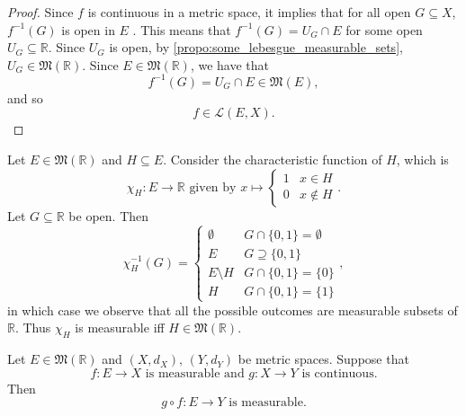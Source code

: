 \documentclass[notoc,notitlepage]{tufte-book}
\begin{document}
\begin{proof}
  Since $f$ is continuous in a metric space, it implies that for all open $G
  \subseteq X$, $f^{-1}(G)$ is open in $E$ . This means that $f^{-1}(G) = U_G \cap E$ 
  for some open $U_G \subseteq \mathbb{R}$. Since $U_G$ is open, by
  \cref{propo:some_lebesgue_measurable_sets}, $U_G \in
  \mathfrak{M}(\mathbb{R})$. Since $E \in \mathfrak{M}(\mathbb{R})$, we have
  that
  \begin{equation*}
    f^{-1}(G) = U_G \cap E \in \mathfrak{M}(E),
  \end{equation*}
  and so
  \begin{equation*}
    f \in \mathcal{L}(E, X).
  \end{equation*}
\end{proof}

\begin{eg}\label{eg:characteristic_function_is_measurable_over_a_measurable_set}
  Let $E \in \mathfrak{M}(\mathbb{R})$ and $H \subseteq E$. Consider the
  characteristic function of $H$, which is
  \begin{equation*}
    \chi_H : E \to \mathbb{R} \text{ given by } x \mapsto \begin{cases}
      1 & x \in H \\
      0 & x \notin H
    \end{cases}.
  \end{equation*}
  Let $G \subseteq \mathbb{R}$ be open. Then
  \begin{equation*}
    \chi_H^{-1}(G) = \begin{cases}
      \emptyset & G \cap \{ 0, 1 \} = \emptyset \\
      E & G \supseteq \{ 0, 1 \} \\
      E \setminus H & G \cap \{ 0, 1 \} = \{ 0 \} \\
      H & G \cap \{ 0, 1 \} = \{ 1 \}
    \end{cases},
  \end{equation*}
  in which case we observe that all the possible outcomes are measurable subsets
  of $\mathbb{R}$. Thus $\chi_H$ is measurable iff $H \in
  \mathfrak{M}(\mathbb{R})$.
\end{eg}

\begin{propo}\label{propo:composition_of_a_continuous_function_and_a_measurable_function_is_measurable}
  Let $E \in \mathfrak{M}(\mathbb{R})$ and $(X, d_X),\, (Y, d_Y)$ be metric
  spaces. Suppose that
  \begin{equation*}
    f : E \to X \text{ is measurable and } g : X \to Y \text{ is continuous}.
  \end{equation*}
  Then
  \begin{equation*}
    g \circ f : E \to Y \text{ is measurable}.
  \end{equation*}
\end{propo}
\end{document}
